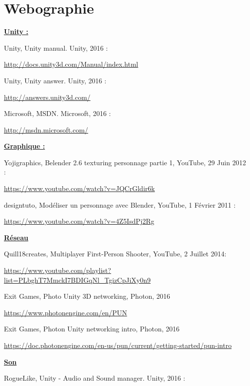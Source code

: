 \documentclass[a4paper , 12pt]{article}
\begin{document}
\newpage

\section{Webographie}

\underline{\textbf{Unity :}}

Unity, Unity manual. Unity, 2016 :


\url{http://docs.unity3d.com/Manual/index.html}

\quad

Unity, Unity answer. Unity, 2016 :


\url{http://answers.unity3d.com/}

\quad

Microsoft, MSDN. Microsoft, 2016 :


\url{http://msdn.microsoft.com/}

\quad


\underline{\textbf{Graphique :}}

Yojigraphics, Belender 2.6 texturing personnage partie 1, YouTube, 29 Juin 2012 : 

\url{https://www.youtube.com/watch?v=JQCrGldir6k}

\quad

designtuto, Modéliser un personnage avec Blender, YouTube, 1 Février 2011 :


\url{https://www.youtube.com/watch?v=4Z5IsdPj2Rg}

\quad

\underline{\textbf{Réseau}}

Quill18creates, Multiplayer First-Person Shooter, YouTube, 2 Juillet 2014:


\url{https://www.youtube.com/playlist?list=PLbghT7MmckI7BDIGqNl_TgizCpJiXy0n9}

\quad

Exit Games, Photo Unity 3D networking, Photon, 2016 


\url{https://www.photonengine.com/en/PUN}

\quad

Exit Games, Photon Unity networking intro, Photon, 2016


\url{https://doc.photonengine.com/en-us/pun/current/getting-started/pun-intro}

\quad

\newpage

\underline{\textbf{Son}}

RogueLike, Unity - Audio and Sound manager. Unity, 2016 :
\end{document}
